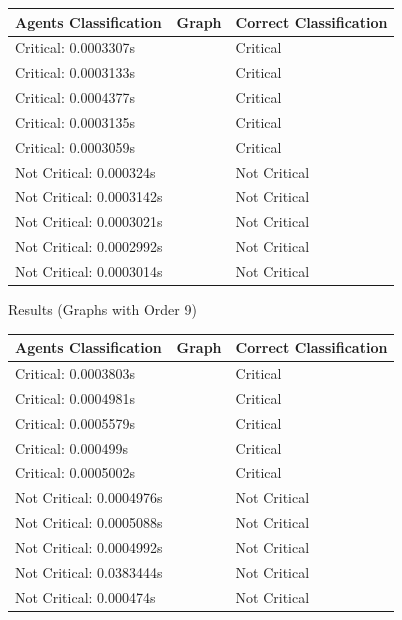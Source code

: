 \documentclass[12pt, letterpaper, twoside]{article}
\begin{document}
\begin{tabularx}{0.9\textwidth} { 
  | >{\raggedright\arraybackslash}X 
  | >{\centering\arraybackslash}X 
  | >{\raggedleft\arraybackslash}X | }
  
\toprule
Agents Classification & Graph & Correct Classification \\
\midrule

 Critical: 0.0003307s &  & Critical \\
 \hline
 Critical: 0.0003133s & & Critical  \\
 \hline
  Critical: 0.0004377s &  & Critical \\
 \hline
 Critical: 0.0003135s & & Critical \\
 \hline
 Critical: 0.0003059s &  & Critical \\
 \hline

 Not Critical: 0.000324s &  & Not Critical  \\
 \hline
 Not Critical: 0.0003142s &  & Not Critical  \\
 \hline
 Not Critical: 0.0003021s &  & Not Critical  \\
 \hline
 Not Critical: 0.0002992s &  & Not Critical  \\
 \hline
 Not Critical: 0.0003014s &  & Not Critical  \\
 \hline

\hline
\end{tabularx}


Results (Graphs with Order 9)

\begin{tabularx}{0.9\textwidth} { 
  | >{\raggedright\arraybackslash}X 
  | >{\centering\arraybackslash}X 
  | >{\raggedleft\arraybackslash}X | }
  
\toprule
Agents Classification & Graph & Correct Classification \\
\midrule

 Critical: 0.0003803s &  & Critical \\
 \hline
 Critical: 0.0004981s & & Critical  \\
 \hline
  Critical: 0.0005579s &  & Critical \\
 \hline
 Critical: 0.000499s & & Critical \\
 \hline
 Critical: 0.0005002s &  & Critical \\
 \hline

 Not Critical: 0.0004976s &  & Not Critical  \\
 \hline
 Not Critical: 0.0005088s &  & Not Critical  \\
 \hline
 Not Critical: 0.0004992s &  & Not Critical  \\
 \hline
 Not Critical: 0.0383444s &  & Not Critical  \\
 \hline
 Not Critical: 0.000474s &  & Not Critical  \\
 \hline

\hline
\end{tabularx}
\end{document}
